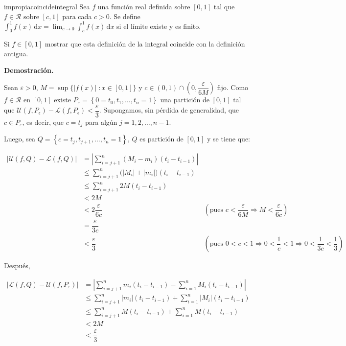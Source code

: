 \documentclass[12pt]{article}
\newenvironment{ejercicio}[1]{\begin{ejer}[breakable, pad at break = 5mm, leftrule = 0.7mm, rightrule = 0.7mm, right = 2mm, left = 2mm, enlarge bottom finally by = 3mm, fontlower = \setlength{\parskip}{2mm}]{}{#1}}{\end{ejer}}
\newcommand{\talque}{\; \mathbf{\colon}}
\newcommand{\intg}[4]{\int_{#1}^{#2} #3 \, \mathrm{d} #4}
\begin{document}
	\begin{ejercicio}{impropiacoincideintegral}
		Sea $f$ una función real definida sobre $ [0,1] $ tal que $ f \in \mathcal{R} $ sobre $ [c,1] $ para cada $ c > 0 $. Se define $ \displaystyle \intg{0}{1}{f(x)}{x} = \lim_{c \to 0} \intg{c}{1}{f(x)}{x} $ si el límite existe y es finito.

		Si $ f \in [0,1] $ mostrar que esta definición de la integral coincide con la definición antigua.
		
		\tcblower

		\textbf{Demostración.}

		Sean $ \varepsilon > 0 $, $ M = \sup \bigl\lbrace |f(x)| \talque x \in [0,1] \bigr\rbrace $ y $ c \in (0,1) \cap \left( 0, \dfrac{\varepsilon}{6M} \right) $ fijo. Como $ f \in \mathcal{R} $ en $ [0,1] $ existe $ P_\varepsilon = \left\lbrace 0 = t_0, t_1, \ldots, t_n = 1 \right\rbrace $ una partición de $ [0,1] $ tal que $ \mathcal{U} (f,P_\epsilon) - \mathcal{L} (f,P_\epsilon) < \dfrac{\varepsilon}{3} $. Supongamos, sin pérdida de generalidad, que $ c \in P_\varepsilon $, es decir, que $ c = t_j $ para algún $ j = 1, 2, \ldots, n-1 $.

		Luego, sea $ Q = \left\lbrace c = t_j, t_{j+1}, \ldots, t_n = 1 \right\rbrace $, $Q$ es partición de $ [0,1] $ y se tiene que:

		\begin{align*}
			\bigl\lvert \mathcal{U} (f,Q) - \mathcal{L} (f,Q) \bigr\rvert &= \left\lvert \sum_{i=j+1}^{n} (M_i - m_i) (t_i - t_{i-1}) \right\rvert & \\
			&\leq \sum_{i=j+1}^{n} \bigl( \left\lvert M_i \right\rvert + \left\lvert m_i \right\rvert \bigr) (t_i - t_{i-1}) & \\
			&\leq \sum_{i=j+1}^{n} 2M (t_i - t_{i-1}) & \\
			&< 2M & \\
			&< 2 \dfrac{\varepsilon}{6c} & \left( \mbox{pues } c < \dfrac{\varepsilon}{6M} \Longrightarrow M < \dfrac{\varepsilon}{6c} \right) \\
			&= \dfrac{\varepsilon}{3c} & \\
			&< \dfrac{\varepsilon}{3} & \left( \mbox{pues } 0 < c < 1 \Longrightarrow 0 < \dfrac{1}{c} < 1 \Longrightarrow 0 < \dfrac{1}{3c} < \dfrac{1}{3} \right)
		\end{align*}

		Después,

		\begin{align*}
			\left\lvert \mathcal{L} (f,Q) - \mathcal{U} (f,P_\varepsilon) \right\rvert &= \left\lvert \sum_{i=j+1}^{n} m_i (t_i - t_{i-1}) - \sum_{i=1}^{n} M_i (t_i - t_{i-1}) \right\rvert \\
			&\leq \sum_{i=j+1}^{n} \left\lvert m_i \right\rvert (t_i - t_{i-1}) + \sum_{i=1}^{n} \left\lvert M_i \right\rvert (t_i - t_{i-1}) \\
			&\leq \sum_{i=j+1}^{n} M (t_i - t_{i-1}) + \sum_{i=1}^{n} M (t_i - t_{i-1}) \\
			&< 2M \\
			&< \dfrac{\varepsilon}{3}
		\end{align*}


\end{ejercicio}
\end{document}
